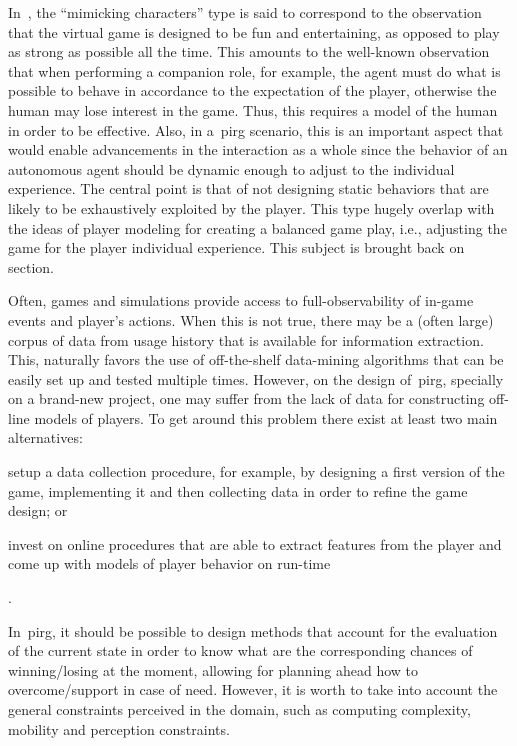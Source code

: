 In~\cite{herik_opponent_2005}, the ``mimicking characters'' type is said to correspond to the observation that the virtual game is designed to be fun and entertaining, as opposed to play as strong as possible all the time. This amounts to the well-known observation that when performing a companion role, for example, the agent must do what is possible to behave in accordance to the expectation of the player, otherwise the human may lose interest in the game. Thus, this requires a model of the human in order to be effective. Also, in a~\gls{pirg} scenario, this is an important aspect that would enable advancements in the interaction as a whole since the behavior of an autonomous agent should be dynamic enough to adjust to the individual experience. The central point is that of not designing static behaviors that are likely to be exhaustively exploited by the player. This type hugely overlap with the ideas of player modeling for creating a balanced game play, i.e., adjusting the game for the player individual experience. This subject is brought back on section.  

Often, games and simulations provide access to full-observability of in-game events and player's actions. When this is not true, there may be a (often large) corpus of data from usage history that is available for information extraction. This, naturally favors the use of off-the-shelf data-mining algorithms that can be easily set up and tested multiple times. However, on the design of~\gls{pirg}, specially on a brand-new project, one may suffer from the lack of data for constructing off-line models of players. To get around this problem there exist at least two main alternatives: \begin{inparaenum}\item setup a data collection procedure, for example, by designing a first version of the game, implementing it and then collecting data in order to refine the game design; or \item invest on online procedures that are able to extract features from the player and come up with models of player behavior on run-time\end{inparaenum}.

In~\gls{pirg}, it should be possible to design methods that account for the evaluation of the current state in order to know what are the corresponding chances of winning/losing at the moment, allowing for planning ahead how to overcome/support in case of need. However, it is worth to take into account the general constraints perceived in the domain, such as computing complexity, mobility and perception constraints. 

